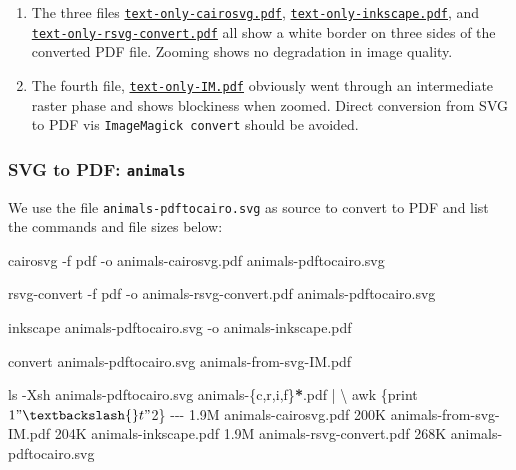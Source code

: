 \documentclass[
  12pt,
  british,
  a4paper,
  rgb,
  dvipsnames,
  svgnames,
  hyphens]{article}
\newenvironment{Shaded}{\begin{snugshade}}{\end{snugshade}}
\newcommand{\AttributeTok}[1]{\textcolor[rgb]{0.80,0.80,0.80}{#1}}
\newcommand{\DataTypeTok}[1]{\textcolor[rgb]{0.87,0.87,0.75}{#1}}
\newcommand{\ExtensionTok}[1]{\textcolor[rgb]{0.80,0.80,0.80}{#1}}
\newcommand{\FunctionTok}[1]{\textcolor[rgb]{0.94,0.94,0.56}{#1}}
\newcommand{\KeywordTok}[1]{\textcolor[rgb]{0.94,0.87,0.69}{#1}}
\newcommand{\NormalTok}[1]{\textcolor[rgb]{0.80,0.80,0.80}{#1}}
\newcommand{\OperatorTok}[1]{\textcolor[rgb]{0.94,0.94,0.82}{#1}}
\newcommand{\PreprocessorTok}[1]{\textcolor[rgb]{1.00,0.81,0.69}{\textbf{#1}}}
\newcommand{\StringTok}[1]{\textcolor[rgb]{0.80,0.58,0.58}{#1}}
\begin{document}
\begin{enumerate}
\def\labelenumi{\alph{enumi}.}
\item
  The three files \href{attach}{\texttt{text-only-cairosvg.pdf}},
  \href{images/text-only-inkscape.pdf}{\texttt{text-only-inkscape.pdf}},
  and
  \href{images/text-only-rsvg-convert.pdf}{\texttt{text-only-rsvg-convert.pdf}}
  all show a white border on three sides of the converted PDF file.
  Zooming shows no degradation in image quality.
\item
  The fourth file,
  \href{images/text-only-IM.pdf}{\texttt{text-only-IM.pdf}} obviously
  went through an intermediate raster phase and shows blockiness when
  zoomed. Direct conversion from SVG to PDF vis
  \texttt{ImageMagick\ convert} should be avoided.
\end{enumerate}

\hypertarget{svg-to-pdf-animals}{%
\subsubsection{\texorpdfstring{SVG to PDF:
\texttt{animals}}{SVG to PDF: animals}}\label{svg-to-pdf-animals}}

We use the file \texttt{animals-pdftocairo.svg} as source to convert to
PDF and list the commands and file sizes below:

\begin{Shaded}
\begin{Highlighting}[]
\ExtensionTok{cairosvg} \AttributeTok{{-}f}\NormalTok{ pdf }\AttributeTok{{-}o}\NormalTok{ animals{-}cairosvg.pdf animals{-}pdftocairo.svg}

\ExtensionTok{rsvg{-}convert} \AttributeTok{{-}f}\NormalTok{ pdf }\AttributeTok{{-}o}\NormalTok{ animals{-}rsvg{-}convert.pdf animals{-}pdftocairo.svg}

\ExtensionTok{inkscape}\NormalTok{ animals{-}pdftocairo.svg }\AttributeTok{{-}o}\NormalTok{ animals{-}inkscape.pdf}

\ExtensionTok{convert}\NormalTok{ animals{-}pdftocairo.svg animals{-}from{-}svg{-}IM.pdf}

\FunctionTok{ls} \AttributeTok{{-}Xsh}\NormalTok{ animals{-}pdftocairo.svg animals{-}}\DataTypeTok{\{c}\OperatorTok{,}\DataTypeTok{r}\OperatorTok{,}\DataTypeTok{i}\OperatorTok{,}\DataTypeTok{f\}}\PreprocessorTok{*}\NormalTok{.pdf }\KeywordTok{|} \DataTypeTok{\textbackslash{}}
\FunctionTok{awk} \StringTok{\textquotesingle{}\{print $1 "\textbackslash{}t" $2\}\textquotesingle{}}
\ExtensionTok{{-}{-}{-}}
\ExtensionTok{1.9M}\NormalTok{    animals{-}cairosvg.pdf}
\ExtensionTok{200K}\NormalTok{    animals{-}from{-}svg{-}IM.pdf}
\ExtensionTok{204K}\NormalTok{    animals{-}inkscape.pdf}
\ExtensionTok{1.9M}\NormalTok{    animals{-}rsvg{-}convert.pdf}
\ExtensionTok{268K}\NormalTok{    animals{-}pdftocairo.svg}
\end{Highlighting}
\end{Shaded}
\end{document}
